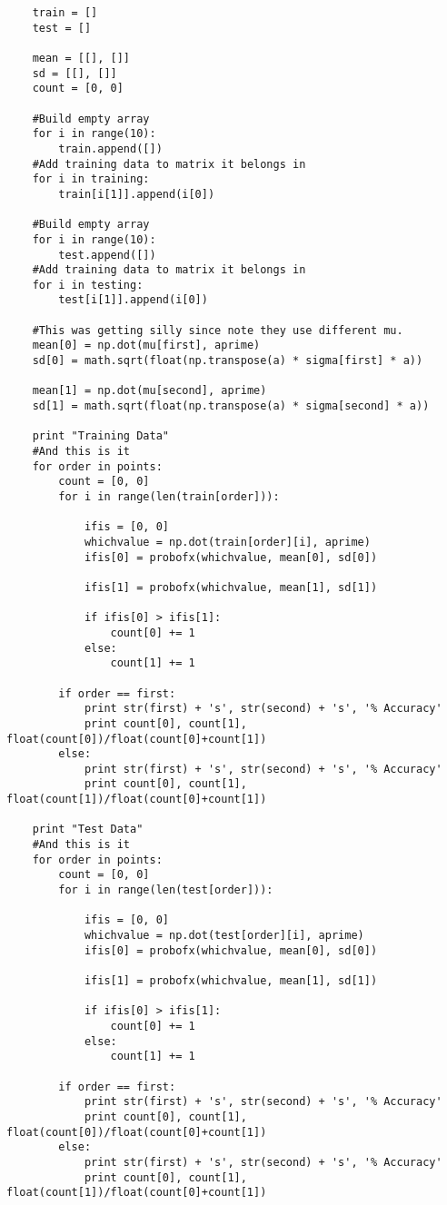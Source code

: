 \documentclass[paper=a4, fontsize=11pt]{scrartcl} %
\numberwithin{equation}{section} %
\numberwithin{figure}{section} %
\numberwithin{table}{section} %
\theoremstyle{statement}
\begin{document}
\begin{verbatim}
    train = []
    test = []
    
    mean = [[], []]
    sd = [[], []]
    count = [0, 0]
    
    #Build empty array
    for i in range(10):
        train.append([])    
    #Add training data to matrix it belongs in
    for i in training:
        train[i[1]].append(i[0])

    #Build empty array
    for i in range(10):
        test.append([])    
    #Add training data to matrix it belongs in
    for i in testing:
        test[i[1]].append(i[0])              
    
    #This was getting silly since note they use different mu.        
    mean[0] = np.dot(mu[first], aprime)
    sd[0] = math.sqrt(float(np.transpose(a) * sigma[first] * a))
    
    mean[1] = np.dot(mu[second], aprime)
    sd[1] = math.sqrt(float(np.transpose(a) * sigma[second] * a))
    
    print "Training Data"
    #And this is it
    for order in points:
        count = [0, 0]
        for i in range(len(train[order])):
            
            ifis = [0, 0]
            whichvalue = np.dot(train[order][i], aprime)
            ifis[0] = probofx(whichvalue, mean[0], sd[0])
            
            ifis[1] = probofx(whichvalue, mean[1], sd[1])
        
            if ifis[0] > ifis[1]:
                count[0] += 1
            else:
                count[1] += 1
                
        if order == first:
            print str(first) + 's', str(second) + 's', '% Accuracy'
            print count[0], count[1], float(count[0])/float(count[0]+count[1])
        else:
            print str(first) + 's', str(second) + 's', '% Accuracy'
            print count[0], count[1], float(count[1])/float(count[0]+count[1])
            
    print "Test Data"
    #And this is it
    for order in points:
        count = [0, 0]
        for i in range(len(test[order])):
            
            ifis = [0, 0]
            whichvalue = np.dot(test[order][i], aprime)
            ifis[0] = probofx(whichvalue, mean[0], sd[0])
            
            ifis[1] = probofx(whichvalue, mean[1], sd[1])
        
            if ifis[0] > ifis[1]:
                count[0] += 1
            else:
                count[1] += 1
                
        if order == first:
            print str(first) + 's', str(second) + 's', '% Accuracy'
            print count[0], count[1], float(count[0])/float(count[0]+count[1])
        else:
            print str(first) + 's', str(second) + 's', '% Accuracy'
            print count[0], count[1], float(count[1])/float(count[0]+count[1])
\end{verbatim}
\end{document}

